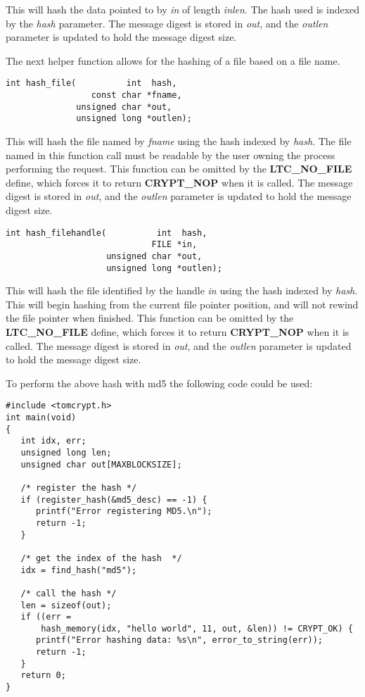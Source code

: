 \documentclass[synpaper]{book}
\begin{document}
This will hash the data pointed to by \textit{in} of length \textit{inlen}.  The hash used is indexed by the \textit{hash} parameter.  The message
digest is stored in \textit{out}, and the \textit{outlen} parameter is updated to hold the message digest size.  

The next helper function allows for the hashing of a file based on a file name.  
\begin{verbatim}
int hash_file(          int  hash, 
                 const char *fname, 
              unsigned char *out, 
              unsigned long *outlen);
\end{verbatim}

This will hash the file named by \textit{fname} using the hash indexed by \textit{hash}.  The file named in this function call must be readable by the 
user owning the process performing the request.  This function can be omitted by the \textbf{LTC\_NO\_FILE} define, which forces it to return \textbf{CRYPT\_NOP}
when it is called.  The message digest is stored in \textit{out}, and the \textit{outlen} parameter is updated to hold the message digest size.  

\begin{verbatim}
int hash_filehandle(          int  hash, 
                             FILE *in, 
                    unsigned char *out, 
                    unsigned long *outlen);
\end{verbatim}

This will hash the file identified by the handle \textit{in} using the hash indexed by \textit{hash}.  This will begin hashing from the current file pointer position, and
will not rewind the file pointer when finished.  This function can be omitted by the \textbf{LTC\_NO\_FILE} define, which forces it to return \textbf{CRYPT\_NOP}
when it is called.  The message digest is stored in \textit{out}, and the \textit{outlen} parameter is updated to hold the message digest size.  

To perform the above hash with md5 the following code could be used:
\begin{small}
\begin{verbatim}
#include <tomcrypt.h>
int main(void)
{
   int idx, err;
   unsigned long len;
   unsigned char out[MAXBLOCKSIZE];

   /* register the hash */
   if (register_hash(&md5_desc) == -1) {
      printf("Error registering MD5.\n");
      return -1;
   }

   /* get the index of the hash  */
   idx = find_hash("md5");

   /* call the hash */
   len = sizeof(out);
   if ((err = 
       hash_memory(idx, "hello world", 11, out, &len)) != CRYPT_OK) {
      printf("Error hashing data: %s\n", error_to_string(err));
      return -1;
   }
   return 0;
}
\end{verbatim}
\end{small}
\end{document}

